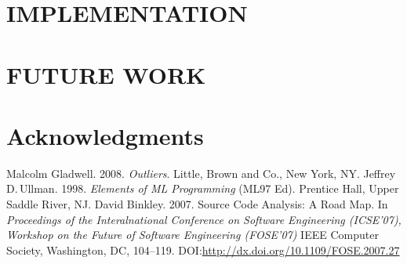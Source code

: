 \documentclass[12pt,abstracton]{scrartcl}
\begin{document}
\section{IMPLEMENTATION}\label{sec:impl}
\section{FUTURE WORK}\label{sec:future}
\section*{Acknowledgments}
\begin{thebibliography}{99}
 Malcolm Gladwell. 2008. \emph{Outliers}. Little, Brown and Co., New York, NY.
 Jeffrey D.\,Ullman. 1998. \emph{Elements of ML Programming} (ML97 Ed). Prentice Hall, Upper Saddle River, NJ.
 David Binkley. 2007. Source Code Analysis: A Road Map. In \emph{Proceedings of the Interalnational Conference on Software Engineering (ICSE'07), Workshop on the Future of Software Engineering (FOSE'07)} IEEE Computer Society, Washington, DC, 104--119. DOI:\url{http://dx.doi.org/10.1109/FOSE.2007.27}
\end{thebibliography}
\end{document}
